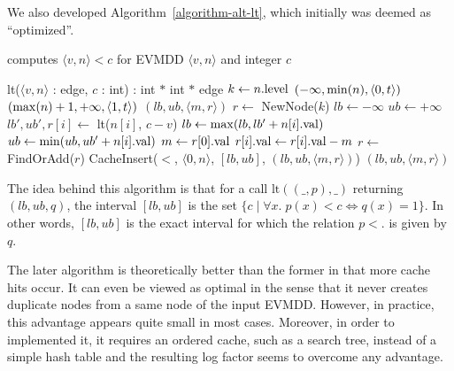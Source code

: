 \documentclass[nocover]             %
{NASA}                       %
\newcommand{\BLANK}{\STATE \vspace{-0.6em}}
\newcommand{\edge}[2]{\langle #1, #2 \rangle}
\newcommand{\val}[1]{#1{\rm .val}}
\newcommand{\level}[1]{#1{\rm .level}}
\begin{document}
We also developed Algorithm~\vref{algorithm-alt-lt}, which initially was deemed as ``optimized''.
\begin{algorithm}[htbp]
  \caption{computes $\edge{v}{n} < c$ for EVMDD $\edge{v}{n}$ and integer $c$}
  \label{algorithm-alt-lt}
  \begin{algorithmic}
    \item[lt($\edge{v}{n}$ : edge, $c$ : int) : int $*$ int $*$ edge]
    \STATE $k \gets \level{n}$
    \BLANK
    \STATE {}
      \RETURN $(-\infty, {\rm min}(n), \edge{0}{t})$ 
    \ENDIF
      \RETURN $({\rm max}(n)+1, +\infty, \edge{1}{t})$ 
    \ENDIF
    \BLANK
    \STATE {}
    \IF{CacheFind($<$, $\edge{0}{n}$, $c-v$, $(lb, ub, \edge{m}{r})$)}
      \RETURN $(lb, ub, \edge{m}{r})$
    \ENDIF
    \BLANK
    \STATE $r \gets$ NewNode($k$)
    \STATE $lb \gets -\infty$
    \STATE $ub \gets +\infty$
      \STATE $lb', ub', r[i] \gets$ lt($n[i]$, $c-v$)
      \STATE $lb \gets {\rm max}(lb, lb'+\val{n[i]})$
      \STATE $ub \gets {\rm min}(ub, ub'+\val{n[i]})$
    \ENDFOR
    \STATE $m \gets \val{r[0]}$
      \STATE $\val{r[i]} \gets \val{r[i]}-m$
    \ENDFOR
    \BLANK
    \STATE {}
    \STATE $r \gets$ FindOrAdd($r$)
    \BLANK
    \STATE {}
    \STATE CacheInsert($<$, $\edge{0}{n}$, $[lb, ub]$, $(lb, ub, \edge{m}{r})$)
    \BLANK
    \RETURN $(lb, ub, \edge{m}{r})$
  \end{algorithmic}
\end{algorithm}
The idea behind this algorithm is that
for a call $\mathrm{lt}((\_, p), \_)$ returning $(lb, ub, q)$, the 
interval $[lb, ub]$ is the set $\{c \;|\; \forall x.\; 
p\left(x\right) < c \Leftrightarrow 
q\left(x\right) = 1\}$. In other words, $[lb, ub]$
is the exact interval for which the relation $p < .$ is given by $q$.

The later algorithm is theoretically better than the former in that
more cache hits occur. It can even be viewed as optimal in the sense that
it never creates duplicate nodes from a same node of the input EVMDD.
However, in practice, this advantage appears quite small in most cases.
Moreover, in order to implemented it, it requires an ordered cache, such as a search tree,
instead of a simple hash table and the resulting log factor seems to overcome
any advantage.
\end{document}
